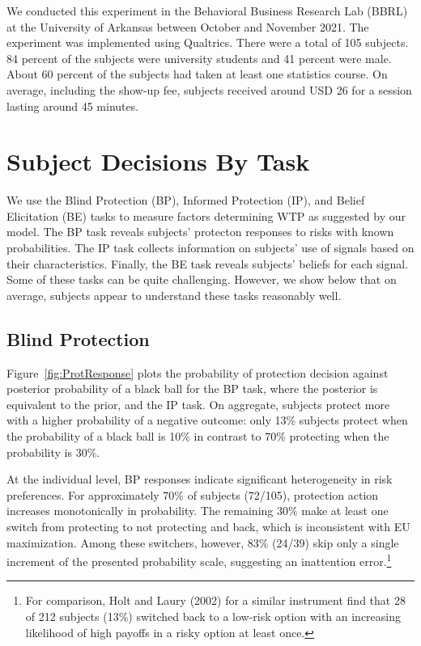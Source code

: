 \documentclass[12pt,a4paper]{article}
\begin{document}

We conducted this experiment in the Behavioral Business Research Lab (BBRL) at the University of Arkansas between October and November 2021.  The experiment was implemented using Qualtrics. There were a total of 105 subjects. 84 percent of the subjects were university students and 41 percent were male.  About 60 percent of the subjects had taken at least one statistics course. On average, including the show-up fee, subjects received around USD 26 for a session lasting around 45 minutes.  


\vspace{20pt}
\section{Subject Decisions By Task}\label{sec:sanity}

We use the Blind Protection (BP), Informed Protection (IP), and Belief Elicitation (BE) tasks to measure factors determining WTP as suggested by our model. The BP task reveals subjects' protecton responses to risks with known probabilities. The IP task collects information on subjects' use of signals based on their characteristics. Finally, the BE task reveals subjects' beliefs for each signal. Some of these tasks can be quite challenging. However, we show below that on average, subjects appear to understand these tasks reasonably well.

\subsection{Blind Protection}

Figure~\ref{fig:ProtResponse} plots the probability of protection decision against posterior probability of a black ball for the BP task, where the posterior is equivalent to the prior, and the IP task. On aggregate, subjects protect more with a higher probability of a negative outcome: only 13\% subjects protect when the probability of a black ball is 10\% in contrast to 70\% protecting when the probability is 30\%. 

At the individual level, BP responses indicate significant heterogeneity in risk preferences. For approximately 70\% of subjects (72/105), protection action increases monotonically in probability. The remaining 30\% make at least one switch from protecting to not protecting and back, which is inconsistent with EU maximization. Among these switchers, however, 83\% (24/39) skip only a single increment of the presented probability scale, suggesting an inattention error.\footnote{For comparison, Holt and Laury (2002) for a similar instrument find that 28 of 212 subjects (13\%) switched back to a low-risk option with an increasing likelihood of high payoffs in a risky option at least once.} 
\end{document}
